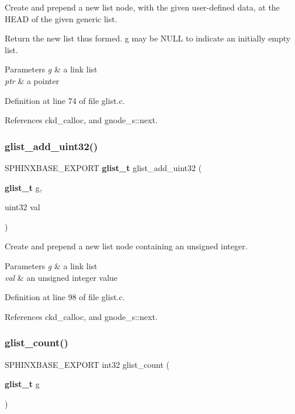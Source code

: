 Create and prepend a new list node, with the given user-\/defined data, at the H\+E\+AD of the given generic list. 

Return the new list thus formed. g may be N\+U\+LL to indicate an initially empty list. 
\begin{DoxyParams}{Parameters}
{\em g} & a link list \\
\hline
{\em ptr} & a pointer \\
\hline
\end{DoxyParams}


Definition at line 74 of file glist.\+c.



References ckd\+\_\+calloc, and gnode\+\_\+s\+::next.

\mbox{\label{glist_8h_aeb741d435322f34df5e5d3a99abf00de}} 
\subsubsection{glist\+\_\+add\+\_\+uint32()}
{\footnotesize\ttfamily S\+P\+H\+I\+N\+X\+B\+A\+S\+E\+\_\+\+E\+X\+P\+O\+RT \textbf{ glist\+\_\+t} glist\+\_\+add\+\_\+uint32 (\begin{DoxyParamCaption}\item[{\textbf{ glist\+\_\+t}}]{g,  }\item[{uint32}]{val }\end{DoxyParamCaption})}



Create and prepend a new list node containing an unsigned integer. 


\begin{DoxyParams}{Parameters}
{\em g} & a link list \\
\hline
{\em val} & an unsigned integer value \\
\hline
\end{DoxyParams}


Definition at line 98 of file glist.\+c.



References ckd\+\_\+calloc, and gnode\+\_\+s\+::next.

\mbox{\label{glist_8h_aeb046e39c540d2f5f792119ea0d24c48}} 
\subsubsection{glist\+\_\+count()}
{\footnotesize\ttfamily S\+P\+H\+I\+N\+X\+B\+A\+S\+E\+\_\+\+E\+X\+P\+O\+RT int32 glist\+\_\+count (\begin{DoxyParamCaption}\item[{\textbf{ glist\+\_\+t}}]{g }\end{DoxyParamCaption})}



